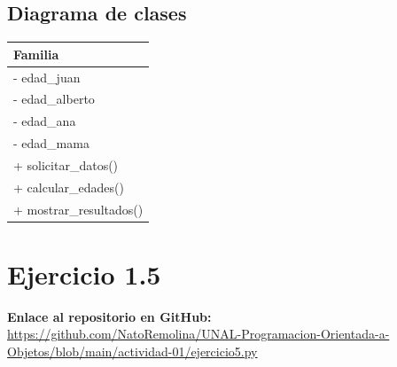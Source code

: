 \documentclass[11pt, a4paper]{article}
\newcommand{\clasebox}[3]{%
\begin{center}
\begin{tabular}{|l|}
\hline
\textbf{#1} \\
\hline
#2
\hline
#3
\hline
\end{tabular}
\end{center}
}
\begin{document}
\subsection{Diagrama de clases}
\clasebox{Familia}
{%
- edad\_juan \\
- edad\_alberto \\
- edad\_ana \\
- edad\_mama \\
}
{%
+ solicitar\_datos() \\
+ calcular\_edades() \\
+ mostrar\_resultados() \\
}

\newpage
\section{Ejercicio 1.5}

\noindent \textbf{Enlace al repositorio en GitHub:} \\
\url{https://github.com/NatoRemolina/UNAL-Programacion-Orientada-a-Objetos/blob/main/actividad-01/ejercicio5.py}
\end{document}
